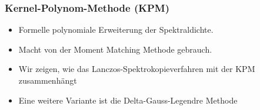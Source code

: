\begin{frame}
    \frametitle{Kernel-Polynom-Methode (KPM)}
    \begin{itemize}
        \item Formelle polynomiale Erweiterung der Spektraldichte.
        \item Macht von der Moment Matching Methode gebrauch.
        \item Wir zeigen, wie das Lanczos-Spektrokopieverfahren mit der KPM zusammenhängt
        \item Eine weitere Variante ist die Delta-Gauss-Legendre Methode
    \end{itemize}
\end{frame}